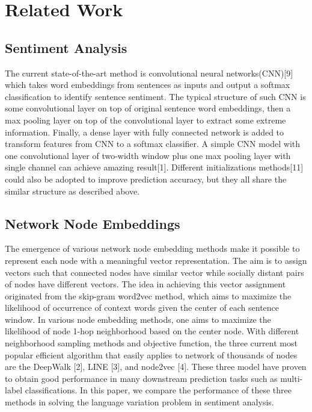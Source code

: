 \section{Related Work}

\subsection*{Sentiment Analysis}

The current state-of-the-art method is convolutional neural networks(CNN)[9] which takes word embeddings from sentences as inputs and output a softmax classification to identify sentence sentiment. The typical structure of such CNN is some convolutional layer on top of original sentence word embeddings, then a max pooling layer on top of the convolutional layer to extract some extreme information.  Finally, a dense layer with fully connected network is added to transform features from CNN to a softmax classifier. A simple CNN model with one convolutional layer of two-width window plus one max pooling layer with single channel can achieve amazing result[1]. Different initializations methods[11] could also be adopted to improve prediction accuracy, but they all share the similar structure as described above.


\subsection*{Network Node Embeddings}
The emergence of various network node embedding methods make it possible to represent each node with a meaningful
vector representation. The aim is to assign vectors such that connected nodes have similar vector while
socially distant pairs of nodes have different vectors. The idea in achieving this vector assignment originated
from the skip-gram word2vec method, which aims to maximize the likelihood of occurrence of context words given
the center of each sentence window. In various node embedding methods, one aims to maximize the likelihood
of node 1-hop neighborhood based on the center node. With different neighborhood sampling methods and objective function,
the three current most popular efficient algorithm that easily applies to network of thousands of nodes are the 
DeepWalk [2], LINE [3], and node2vec [4]. These three model have proven to obtain good performance
in many downstream prediction tasks such as multi-label classifications. In this paper, we compare the performance
of these three methods in solving the language variation problem in sentiment analysis. 




